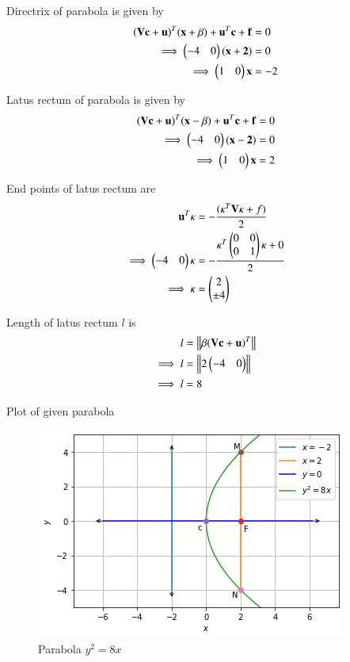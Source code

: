 \documentclass[journal,12pt,twocolumn]{IEEEtran}
\begin{document}
Directrix of parabola is given by
\begin{align}
(\mathbf{V}\mathbf{c}+\mathbf{u})^T(\mathbf{x} +\beta) + \mathbf{u}^T\mathbf{c} + \mathbf{f} &= 0
\\
\implies \begin{pmatrix}-4 & 0\end{pmatrix}(\mathbf{x+2}) &= 0
\\
\implies \begin{pmatrix}1 & 0\end{pmatrix}\mathbf{x} &= -2
\end{align}

Latus rectum of parabola is given by
\begin{align}
(\mathbf{V}\mathbf{c}+\mathbf{u})^T(\mathbf{x} -\beta) + \mathbf{u}^T\mathbf{c} + \mathbf{f} &= 0
\\
\implies \begin{pmatrix}-4 & 0\end{pmatrix}(\mathbf{x-2}) &= 0
\\
\implies \begin{pmatrix}1 & 0\end{pmatrix}\mathbf{x} &=2
\end{align}

End points of latus rectum are
\begin{align}
\mathbf{u}^T\kappa &= -\frac{(\kappa^T\mathbf{V}\kappa + f )}{2}
\\
\implies \begin{pmatrix}-4 & 0\end{pmatrix}\kappa &= -\frac{\kappa^T\begin{pmatrix}0 & 0\\0 & 1\end{pmatrix}\kappa + 0}{2}
\\
\implies \kappa &= \begin{pmatrix}2 \\ \pm 4\end{pmatrix}
\end{align}

Length of latus rectum $l$ is 
\begin{align}
l &= \left\lVert\beta(\mathbf{V}\mathbf{c}+\mathbf{u})^T\right\rVert
\\
\implies l &= \left\lVert2\begin{pmatrix}-4 & 0\end{pmatrix}\right\rVert
\\
\implies l &= 8 
\end{align}

Plot of given parabola

\begin{figure}[!ht]
\centering
\includegraphics[width=\columnwidth]{Figure6}
\caption{Parabola $y^2=8x$ }
\label{fig:parabola}	
\end{figure}
\end{document}

